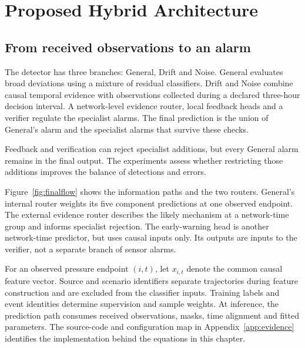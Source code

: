 \chapter{Proposed Hybrid Architecture}
\label{ch:architecture}

\section{From received observations to an alarm}
The detector has three branches: General, Drift and Noise. General evaluates broad deviations using a mixture of residual classifiers. Drift and Noise combine causal temporal evidence with observations collected during a declared three-hour decision interval. A network-level evidence router, local feedback heads and a verifier regulate the specialist alarms. The final prediction is the union of General's alarm and the specialist alarms that survive these checks.

Feedback and verification can reject specialist additions, but every General alarm remains in the final output. The experiments assess whether restricting those additions improves the balance of detections and errors.

Figure~\ref{fig:finalflow} shows the information paths and the two routers. General's internal router weights its five component predictions at one observed endpoint. The external evidence router describes the likely mechanism at a network-time group and informs specialist rejection. The early-warning head is another network-time predictor, but uses causal inputs only. Its outputs are inputs to the verifier, not a separate branch of sensor alarms.


For an observed pressure endpoint $(i,t)$, let $x_{i,t}$ denote the common causal feature vector. Source and scenario identifiers separate trajectories during feature construction and are excluded from the classifier inputs. Training labels and event identities determine supervision and sample weights. At inference, the prediction path consumes received observations, masks, time alignment and fitted parameters. The source-code and configuration map in Appendix~\ref{app:evidence} identifies the implementation behind the equations in this chapter.

